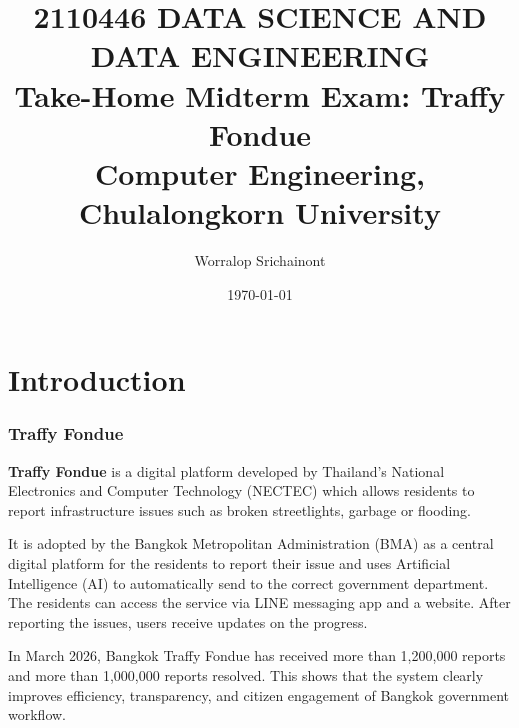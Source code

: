 \documentclass[12pt, a4paper]{article}
\title {
	\textbf{2110446 DATA SCIENCE AND DATA ENGINEERING} \\
    \vspace{1em}
	\Large{\textbf{Take-Home Midterm Exam: Traffy Fondue}} \\
    \vspace{0.5em}
    \large{Computer Engineering, Chulalongkorn University}
}
\author{Worralop Srichainont}
\date{\today}
\begin{document}
    \maketitle
    \thispagestyle{empty}
    \clearpage

    \pagestyle{empty}
    \tableofcontents
    \clearpage

    \pagestyle{plain}

    \part{Introduction}
        \section{Traffy Fondue}
            \textbf{Traffy Fondue} is a digital platform developed by Thailand's National Electronics and Computer Technology (NECTEC)
            which allows residents to report infrastructure issues such as broken streetlights, garbage or flooding.

            \vspace{1em}

            It is adopted by the Bangkok Metropolitan Administration (BMA) as a central digital platform for the residents
            to report their issue and uses Artificial Intelligence (AI) to automatically send to the correct government department.
            The residents can access the service via LINE messaging app and a website.
            After reporting the issues, users receive updates on the progress.

            \vspace{1em}

            In March 2026, Bangkok Traffy Fondue has received more than 1,200,000 reports and more than 1,000,000 reports resolved.
            This shows that the system clearly improves efficiency, transparency, and citizen engagement of Bangkok government workflow.
\end{document}
